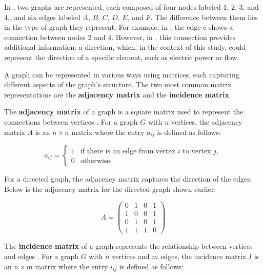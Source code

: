 In , two graphs are represented, each composed of four nodes labeled $1$, $2$, $3$, and $4$,, and six edges labeled $A$, $B$, $C$, $D$, $E$, and $F$. The difference between them lies in the type of graph they represent. For example, in , the edge c shows a connection between nodes 2 and 4. However, in , this connection provides additional information: a direction, which, in the context of this study, could represent the direction of a specific element, such as electric power or flow.


A graph can be represented in various ways using matrices, each capturing different aspects of the graph's structure. The two most common matrix representations are the \textbf{adjacency matrix} and the \textbf{incidence matrix}.

The \textbf{adjacency matrix} of a graph is a square matrix used to represent the connections between vertices \cite{wilson_1972}. For a graph $G$ with $n$ vertices, the adjacency matrix $A$ is an $n \times n$ matrix where the entry $a_{ij}$ is defined as follows:

\begin{equation}
 a_{ij} = 
\begin{cases}
1 & \text{if there is an edge from vertex } i \text{ to vertex } j, \\
0 & \text{otherwise}.
\end{cases}
    \label{eq:adjacency_matrix_definition}
\end{equation}


For a directed graph, the adjacency matrix captures the direction of the edges. Below is the adjacency matrix for the directed graph shown earlier:

\[
A = \begin{pmatrix}
0 & 1 & 0 & 1 \\
1 & 0 & 0 & 1 \\
0 & 1 & 0 & 1 \\
1 & 1 & 1 & 0
\end{pmatrix}
\]


The \textbf{incidence matrix} of a graph represents the relationship between vertices and edges \cite{wilson_1972}. For a graph $G$ with $n$ vertices and $m$ edges, the incidence matrix $I$ is an $n \times m$ matrix where the entry $i_{ij}$ is defined as follows:


